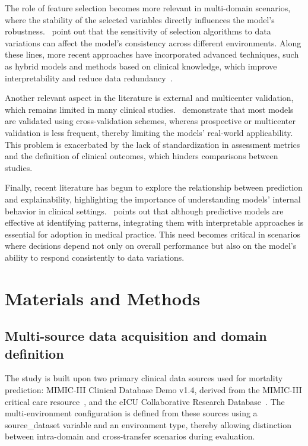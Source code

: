 \documentclass[utf8]{FrontiersinHarvard} %
\begin{document}
The role of feature selection becomes more relevant in multi-domain scenarios, where the stability of the selected variables directly influences the model's robustness.~\citet{Theng2023} point out that the sensitivity of selection algorithms to data variations can affect the model's consistency across different environments. Along these lines, more recent approaches have incorporated advanced techniques, such as hybrid models and methods based on clinical knowledge, which improve interpretability and reduce data redundancy~\citet{Dardour2025,Sowan2025}.

Another relevant aspect in the literature is external and multicenter validation, which remains limited in many clinical studies.~\citet{Mercier2026} demonstrate that most models are validated using cross-validation schemes, whereas prospective or multicenter validation is less frequent, thereby limiting the models' real-world applicability. This problem is exacerbated by the lack of standardization in assessment metrics and the definition of clinical outcomes, which hinders comparisons between studies.

Finally, recent literature has begun to explore the relationship between prediction and explainability, highlighting the importance of understanding models' internal behavior in clinical settings.~\citet{Oh2024} points out that although predictive models are effective at identifying patterns, integrating them with interpretable approaches is essential for adoption in medical practice. This need becomes critical in scenarios where decisions depend not only on overall performance but also on the model's ability to respond consistently to data variations.


\section{Materials and Methods}
\subsection{Multi-source data acquisition and domain definition}

The study is built upon two primary clinical data sources used for mortality prediction: MIMIC-III Clinical Database Demo v1.4, derived from the MIMIC-III critical care resource~\citet{Johnson2016MIMIC,PhysioNetMIMICIIIDemo2019}, and the eICU Collaborative Research Database~\citet{Pollard2018eICU,PhysioNeteICU2018}. The multi-environment configuration is defined from these sources using a source\_dataset variable and an environment type, thereby allowing distinction between intra-domain and cross-transfer scenarios during evaluation.
\end{document}
